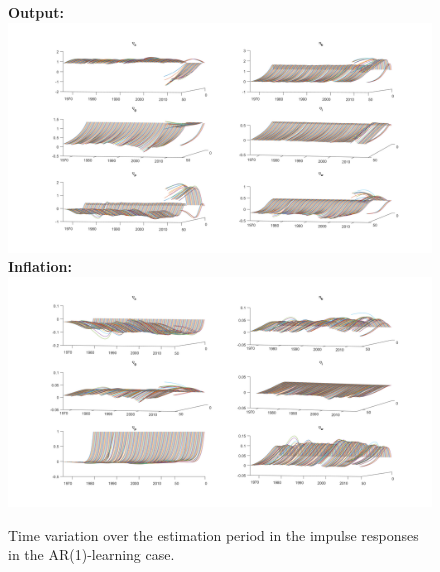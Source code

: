 \documentclass[12pt,reqno]{article}
\numberwithin{equation}{section}
\begin{document}
\begin{figure}[H]
\caption{Time variation over the estimation period in the impulse responses in the AR(1)-learning case. } 
\label{irf_ar1_2_3d}
\textbf{Output:}\\
\includegraphics[scale=0.5]{AR1_impresp_output_3d.pdf}
\textbf{Inflation:}\\
\includegraphics[scale=0.5]{AR1_impresp_pinf_3d.pdf}

\end{figure}







\end{document}
